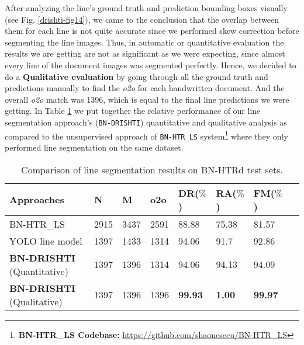 \documentclass[runningheads]{llncs}
\begin{document}
\noindent After analyzing the line’s ground truth and prediction bounding boxes visually (see Fig. \ref{drishti-fig14}), we came to the conclusion that the overlap between them for each line is not quite accurate since we performed skew correction before segmenting the line images. Thus, in automatic or quantitative evaluation the results we are getting are not as significant as we were expecting, since almost every line of the document images was segmented perfectly. Hence, we decided to do a \textbf{Qualitative evaluation} by going through all the ground truth and predictions manually to find the \textit{o2o} for each handwritten document. And the overall \textit{o2o} match was 1396, which is equal to the final line predictions we were getting. In Table \ref{drishti-tab4} we put together the relative performance of our line segmentation approach’s (\texttt{BN-DRISHTI}) quantitative and qualitative analysis as compared to the unsupervised approach of \texttt{BN-HTR\_LS} system\footnote{\textbf{BN-HTR\_LS Codebase:} \url{https://github.com/shaoncsecu/BN-HTR\_LS}} \cite{rahman2023bn} where they only performed line segmentation on the same dataset.

\begin{table}
\vspace{-4mm}
\centering
\caption{Comparison of line segmentation results on BN-HTRd test sets.}\label{drishti-tab4}
\begin{tabular}{|p{0.4\linewidth}|p{0.08\linewidth}|p{0.08\linewidth}|p{0.08\linewidth}|p{0.1\linewidth}|p{0.1\linewidth}|p{0.1\linewidth}|p{0.1\linewidth}|}
\hline
\textbf{Approaches} & \textbf{N}	&  \textbf{M} & \textbf{o2o} & \textbf{DR($\%$)} & \textbf{RA($\%$)} & \textbf{FM($\%$)} \\
\hline
BN-HTR\_LS \cite{rahman2023bn} & 2915 & 3437 & 2591 & 88.88 & 75.38 & 81.57 \\
\hline
YOLO line model & 1397 & 1433 & 1314 & 94.06 & 91.7 & 92.86 \\
\hline
\textbf{BN-DRISHTI} (Quantitative) & 1397 & 1396 & 1314 & 94.06 & 94.13 & 94.09 \\
\hline
\textbf{BN-DRISHTI} (Qualitative) & 1397 & 1396 & 1396 & \textbf{99.93} & \textbf{1.00} & \textbf{99.97} \\
\hline
\end{tabular}
\vspace{-10mm}
\end{table}
\end{document}
